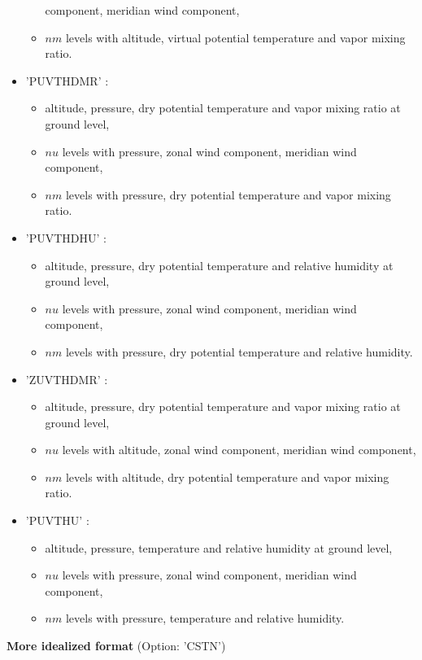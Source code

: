\begin{itemize}
\begin{itemize}
component, meridian wind component, \item  $nm$ levels with   altitude, virtual potential temperature
and vapor mixing ratio. \end{itemize}
\item 'PUVTHDMR'  : \begin{itemize} \item   altitude, pressure, dry potential temperature
and vapor mixing ratio at ground level, \item  $nu$ levels with pressure, zonal wind
component, meridian wind component, \item  $nm$ levels with pressure,
dry potential temperature and vapor mixing ratio.\end{itemize}
\item 'PUVTHDHU'  : \begin{itemize} \item altitude, pressure, dry potential temperature
and relative humidity at ground level, \item  $nu$ levels with pressure, zonal wind
component, meridian wind component, \item  $nm$ levels with pressure,
dry potential temperature and relative humidity.\end{itemize}
\item 'ZUVTHDMR'  : \begin{itemize} \item   altitude, pressure, dry potential temperature
and vapor mixing ratio at ground level, \item  $nu$ levels with  altitude, zonal wind
component, meridian wind component, \item  $nm$ levels with  altitude,
dry potential temperature and vapor mixing ratio.\end{itemize}
\item'PUVTHU'  :  \begin{itemize} \item altitude, pressure, temperature
and relative humidity at ground level, \item  $nu$ levels with pressure, zonal wind
component, meridian wind component, \item  $nm$ levels with pressure, temperature
 and relative humidity.\end{itemize}
\end{itemize}

{\bf More idealized format} (Option: 'CSTN')

